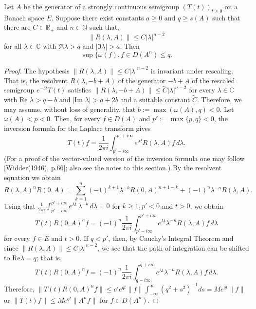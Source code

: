 \begin{theorem}\label{thm:a4-1.9} Let $A$ be the generator of a strongly continuous semigroup $(T(t))_{t \geq 0}$ on a Banach space $E$. 
Suppose there exist constants $a \geq 0$ and $q \geq s(A)$ such that there are $C \in \mathbb{R}_+$ and $n \in \mathbb{N}$ such that, 
    \[
    \| R(\lambda, A) \| \leq C | \lambda |^{n-2}
    \]
    for all $\lambda \in \mathbb{C}$ with $\Re \lambda > q$ and $| \Im \lambda | > a$. 
    Then
    \[
    \sup \{ \omega(f),  f \in D(A^n)  \leq q.\]
\end{theorem}

\begin{proof} The hypothesis $\| R(\lambda, A) \| \leq C | \lambda |^{n-2}$ is invariant under rescaling. 
That is, the resolvent $R(\lambda, -b+A)$ of the generator $-b+A$ of the rescaled semigroup $e^{-bt} T(t)$ satisfies  
$\| R(\lambda, -b+A) \| \leq \tilde{C} | \lambda |^{n-2}$ for every $\lambda \in \mathbb{C}$ with $\text{Re } \lambda > q-b$ and $| \text{Im } \lambda | > a+2b$ and a suitable constant $\tilde{C}$. 
Therefore, we may assume, without loss of generality, that $b := \max(\omega(A), q) < 0$. 
Let $\omega(A) < p < 0$. 
Then, for every $f \in D(A)$ and $p' := \max\{p, q\} < 0$, the inversion formula for the Laplace transform gives 
\begin{equation} \label{eq:a4-1.12}
T(t) f = \frac{1}{2\pi i} \int_{p' - i\infty}^{p' + i\infty} e^{\lambda t} R(\lambda, A) f \, d\lambda.
\end{equation}
\noindent (For a proof of the vector-valued version of the inversion formula one may follow [Widder(1946), p.66]; also see the notes to this section.)
By the resolvent equation we obtain 
   \[ R(\lambda, A)^n R(0, A) = \sum_{k=1}^{n} (-1)^{k+1} \lambda^{-k} R(0, A)^{n+1-k} + (-1)^n \lambda^{-n} R(\lambda, A).
   \]
\noindent  Using that  
\( \frac {1}{2\pi i} \int_{p' - i\infty}^{p' + i\infty} e^{\lambda t} \, \lambda^{-k} \, d\lambda = 0 \) for \( k \geq 1, p' < 0 \) and \( t > 0\), we obtain
 \begin{equation}\label{eq:a4-1.13}
   T(t) R(0, A)^n f = (-1)^n \frac{1}{2\pi i} \int_{p' - i\infty}^{p' + i\infty} e^{\lambda t} \lambda^{-n} R(\lambda, A) f \, d\lambda
    \end{equation}
    \noindent for every $f \in E$ and $t > 0$.
    \noindent If $q < p'$, then, by Cauchy's Integral Theorem and since $\| R(\lambda, A) \| \leq C | \lambda |^{n-2}$, we see that the path of integration can be shifted to $\text{Re} \lambda = q$; 
    \noindent that is,
    \[
    T(t) R(0, A)^n f = (-1)^n \frac{1}{2\pi i} \int_{q - i\infty}^{q + i\infty} e^{\lambda t} \lambda^{-n} R(\lambda, A) f \, d\lambda.
    \]
Therefore,  
\(
\| T(t) R(0,A)^n f \| \leq c' e^{q t} \| f \| \int_{-\infty}^{\infty} (q^2 + s^2)^{-1} ds = M e^{q t} \| f \|\) 
or 
\(
\| T(t) f \| \leq M e^{q t} \| A^n f \|\) for \(f \in D(A^n)\).
\end{proof}




